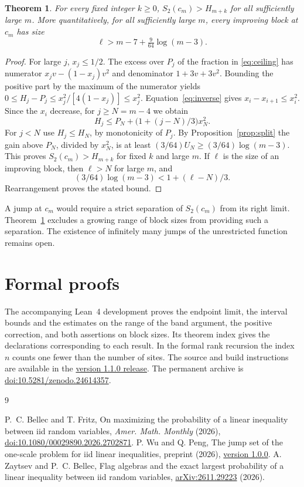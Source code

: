 \documentclass[11pt,reqno]{amsart}
\newtheorem{theorem}{Theorem}[section]
\begin{document}
\begin{theorem}\label{th:labels}
For every fixed integer $k\ge0$, $S_2(c_m)> H_{m+k}$ for all
sufficiently large $m$. More quantitatively, for all sufficiently large
$m$, every improving block at $c_m$ has size
\[
 \ell>m-7+\tfrac9{64}\log(m-3).
\]
\end{theorem}
\begin{proof}
For large $j$, $x_j\le1/2$. The excess over $P_j$ of the fraction in
\eqref{eq:ceiling} has numerator $x_jv-(1-x_j)v^2$ and
denominator $1+3v+3v^2$. Bounding the positive part by the maximum
of the numerator yields $0\le H_j-P_j\le x_j^2/[4(1-x_j)]\le x_j^2$.
Equation~\eqref{eq:inverse} gives $x_i-x_{i+1}\le x_i^2$.
Since the $x_i$ decrease, for $j\ge N=m-4$ we obtain
\[
 H_j\le P_N+\bigl(1+(j-N)/3\bigr)x_N^2.
\]
For $j<N$ use $H_j\le H_N$, by monotonicity of $P_j$.
By Proposition~\ref{prop:split} the gain above $P_N$, divided by
$x_N^2$, is at least $(3/64)U_N\ge(3/64)\log(m-3)$. This proves
$S_2(c_m)>H_{m+k}$ for fixed $k$ and large $m$. If $\ell$ is the
size of an improving block, then $\ell>N$ for large $m$, and
\[
 (3/64)\log(m-3)<1+(\ell-N)/3.
\]
Rearrangement proves the stated bound.
\end{proof}

A jump at $c_m$ would require a strict separation of $S_2(c_m)$
from its right limit. Theorem~\ref{th:labels} excludes a growing
range of block sizes from providing such a separation. The existence
of infinitely many jumps of the unrestricted function remains open.

\section*{Formal proofs}
The accompanying Lean~4 development proves the endpoint limit,
the interval bounds and the estimates on the range of the band argument,
the positive correction, and both assertions on block sizes.
Its theorem index gives the declarations corresponding
to each result. In the formal rank recursion the index $n$ counts
one fewer than the number of sites. The source and build instructions
are available in the
\href{https://github.com/PEIWEIWU-AYS/one-scale-iid-probability-jumps-golden-ratio/releases/tag/endpoint-v1.1.0}{version 1.1.0 release}.
The permanent archive is
\href{https://doi.org/10.5281/zenodo.24614357}{doi:10.5281/zenodo.24614357}.

\begin{thebibliography}{9}
\raggedright
{} P.~C. Bellec and T. Fritz,
On maximizing the probability of a linear inequality between iid random variables,
\emph{Amer. Math. Monthly} (2026),
\href{https://doi.org/10.1080/00029890.2026.2702871}{doi:10.1080/00029890.2026.2702871}.
 P. Wu and Q. Peng,
The jump set of the one-scale problem for iid linear inequalities,
preprint (2026),
\href{https://github.com/PEIWEIWU-AYS/one-scale-iid-probability-jumps-golden-ratio/releases/tag/v1.0.0}{version 1.0.0}.
 A. Zaytsev and P.~C. Bellec,
Flag algebras and the exact largest probability of a linear inequality between iid random variables,
\href{https://arxiv.org/abs/2611.29223}{arXiv:2611.29223} (2026).
\end{thebibliography}
\end{document}
